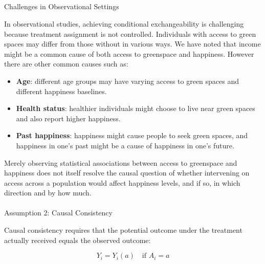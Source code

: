 \documentclass[
  singlecolumn]{article}
\makeatletter
\let\oldparagraph\paragraph
\renewcommand{\paragraph}{
    \@ifstar
      \xxxParagraphStar
      \xxxParagraphNoStar
  }
\newcommand{\xxxParagraphStar}[1]{\oldparagraph*{#1}\mbox{}}
\newcommand{\xxxParagraphNoStar}[1]{\oldparagraph{#1}\mbox{}}
\let\oldsubparagraph\subparagraph
\renewcommand{\subparagraph}{
    \@ifstar
      \xxxSubParagraphStar
      \xxxSubParagraphNoStar
  }
\newcommand{\xxxSubParagraphStar}[1]{\oldsubparagraph*{#1}\mbox{}}
\newcommand{\xxxSubParagraphNoStar}[1]{\oldsubparagraph{#1}\mbox{}}
\providecommand{\tightlist}{%
  \setlength{\itemsep}{0pt}\setlength{\parskip}{0pt}}\usepackage{longtable,booktabs,array}
\makeatother
\begin{document}
\subparagraph{Challenges in Observational
Settings}\label{challenges-in-observational-settings}

In observational studies, achieving conditional exchangeability is
challenging because treatment assignment is not controlled. Individuals
with access to green spaces may differ from those without in various
ways. We have noted that income might be a common cause of both access
to greenspace and happiness. However there are other common causes such
as:

\begin{itemize}
\tightlist
\item
  \textbf{Age}: different age groups may have varying access to green
  spaces and different happiness baselines.
\item
  \textbf{Health status}: healthier individuals might choose to live
  near green spaces and also report higher happiness.
\item
  \textbf{Past happiness}: happiness might cause people to seek green
  spaces, and happiness in one's past might be a cause of happiness in
  one's future.
\end{itemize}

Merely observing statistical associations between access to greenspace
and happiness does not itself resolve the causal question of whether
intervening on access across a population would affect happiness levels,
and if so, in which direction and by how much.

\paragraph{Assumption 2: Causal
Consistency}\label{assumption-2-causal-consistency}

Causal consistency requires that the potential outcome under the
treatment actually received equals the observed outcome:

\[
Y_i = Y_i(a) \quad \text{if } A_i = a
\]
\end{document}
